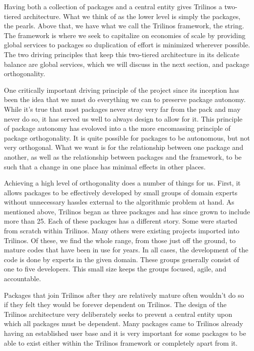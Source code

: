\documentclass[12pt,relax]{article}
\begin{document}
Having both a collection of packages and a central entity gives Trilinos a
two-tiered architecture.  What we think of as the lower level is simply the
packages, the pearls.  Above that, we have what we call the Trilinos framework,
the string.  The framework is where we seek to capitalize on economies of scale
by providing global services to packages so duplication of effort is minimized
wherever possible.  The two driving principles that keep this two-tiered
architecture in its delicate balance are global services, which we will discuss
in the next section, and package orthogonality.

One critically important driving principle of the project since its inception
has been the idea that we must do everything we can to preserve package
autonomy.  While it's true that most packages never stray very far from the
pack and may never do so, it has served us well to always design to allow for
it.  This principle of package autonomy has evoloved into a the more
encomassing principle of package orthogonality.  It is quite possible for
packages to be autonomous, but not very orthogonal.  What we want is for the
relationship between one package and another, as well as the relationship
between packages and the framework, to be such that a change in one place has
minimal effects in other places.

Achieving a high level of orthogonality does a number of things for us.  First,
it allows packages to be effectively developed by small groups of domain
experts without unnecessary hassles external to the algorithmic problem at
hand.  As mentioned above, Trilinos began as three packages and has since
grown to include more than 25.  Each of these packages has a different story.  
Some were started from scratch within Trilinos.  Many others were existing
projects imported into Trilinos.  Of these, we find the whole range, from
those just off the ground, to mature codes that have been in use for years.
In all cases, the development of the code is done by experts in the given
domain.  These groups generally consist of one to five developers.  This
small size keeps the groups focused, agile, and accountable.
  
Packages that join Trilinos after they are relatively mature often wouldn't
do so if they felt they would be forever dependent on Trilinos.  The design
of the Trilinos architecture very deliberately seeks to prevent a central
entity upon which all packages must be dependent.  Many packages came to 
Trilinos already having an established user base and it is very important
for some packages to be able to exist either within the Trilinos framework
or completely apart from it.
\end{document}
